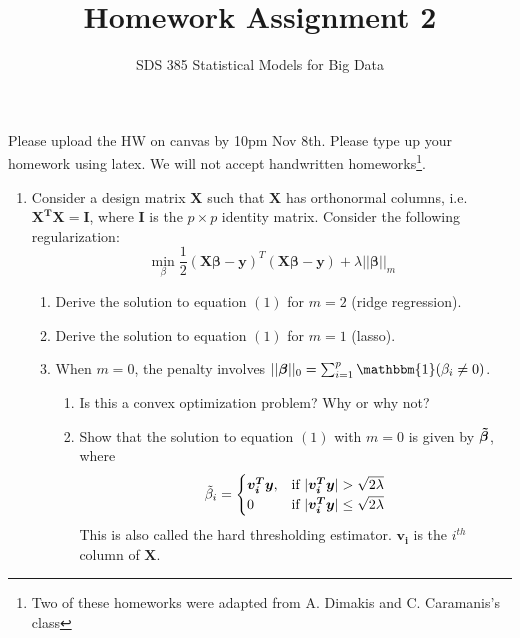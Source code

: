 \documentclass[11pt]{article}
\newcommand{\bi}{\begin{enumerate}}
\newcommand{\ib}{\end{enumerate}}
\newcommand{\p}{\item}
\newcommand{\bm}[1]{\boldsymbol{#1}}
\begin{document}
\title{{\bf Homework Assignment 2}}
\author{SDS 385 Statistical Models for Big Data}

\date{}

\maketitle{}
Please upload the HW on canvas by 10pm Nov 8th. Please type up your homework using latex. We will not accept handwritten homeworks\footnote{Two of these homeworks were adapted from A. Dimakis and C. Caramanis's class}. 

\begin{enumerate}%
\p Consider a design matrix $\bm{X}$ such that $\bm{X}$ has orthonormal columns, i.e.
$\bm{X^T X} = \bm{I}$, where $\bm{I}$ is the $p \times p$ identity matrix. Consider the following regularization:
\begin{equation}
\underset{\beta}{\min}\frac{1}{2}(\bm{X\beta-y})^T(\bm{X\beta-y})+\lambda||\bm{\beta}||_m
\end{equation} %

\bi
\p Derive the solution to equation $(1)$ for $m=2$ (ridge regression).
\p Derive the solution to equation $(1)$ for $m=1$ (lasso).
\p When $m=0$, the penalty involves $||\bm{\bm{\beta}}||_0 = \sum_{i=1}^p \mathbbm{1}(\beta_i\neq 0)$. 
\bi
\p Is this a convex optimization problem? Why or why not?
\p Show that the solution to equation $(1)$ with $m=0$ is given by $\bm{\Tilde{\beta}}$, where
\[
\Tilde{\beta}_i = 
\begin{cases}
\bm{v_i^T y},& \text{if } |\bm{v_i^T y}|>\sqrt{2\lambda}\\
0            & \text{if } |\bm{v_i^T y}|\leq\sqrt{2\lambda}
\end{cases}
\]
This is also called the hard thresholding estimator. $\bm{v_i}$ is the $i^{th}$ column of $\bm{X}$.
\ib
\ib


\end{enumerate}
\end{document}
